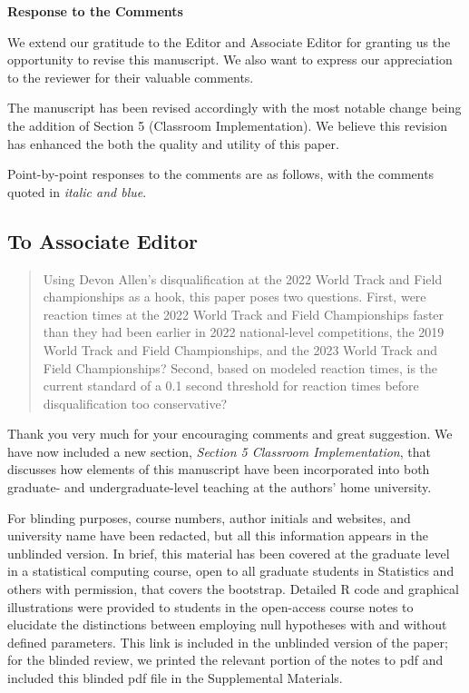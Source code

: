 \documentclass[12pt]{article}
\newcommand{\eds}[1]{\textcolor{blue}{(EDS: #1)}}
\newenvironment{comment}%
{\begin{quotation}\noindent\small\it\color{darkblue}\ignorespaces%
}{\end{quotation}}
\begin{document}
\begin{center}
  {\Large\bf Response to the Comments}
\end{center}

We extend our gratitude to the Editor and Associate Editor for 
granting us the opportunity to revise this manuscript. We also want to
express our appreciation to the reviewer for their valuable comments. 


The manuscript has been revised accordingly with the most notable change being 
the addition of Section 5 (Classroom Implementation). We believe this revision 
has enhanced the both the quality and utility of this paper.


Point-by-point responses to the comments are as follows, with the
comments quoted in \emph{\color{darkblue} italic and blue}.

\subsection*{To Associate Editor}

\begin{comment}
Using Devon Allen's disqualification at the 2022 World Track and Field
championships as a hook, this paper poses two questions. First, were reaction
times at the 2022 World Track and Field Championships faster than they had been
earlier in 2022 national-level competitions, the 2019 World Track and Field
Championships, and the 2023 World Track and Field Championships? Second, based
on modeled reaction times, is the current standard of a 0.1 second threshold for
reaction times before disqualification too conservative?
\end{comment}


Thank you very much for your encouraging comments and great suggestion.  
We have now included a new section, \textit{Section 5 Classroom Implementation},
that discusses how elements of this manuscript have been incorporated into both 
graduate- and undergraduate-level teaching at the authors' home university. 
 

For blinding purposes, course numbers, author initials and websites, and 
university name have been redacted, but all this information appears in the 
unblinded version.  In brief, this material has been covered at the graduate
level in a statistical computing course, open to all graduate students in 
Statistics and others with permission, that covers the bootstrap. Detailed R 
code and graphical illustrations were provided to students in the open-access 
course notes to elucidate the distinctions between employing null
hypotheses with and without defined parameters.  This link is included in the 
unblinded version of the paper; for the blinded review, we printed the 
relevant portion of the notes to pdf and included this blinded pdf file in the 
Supplemental Materials. %
\end{document}
